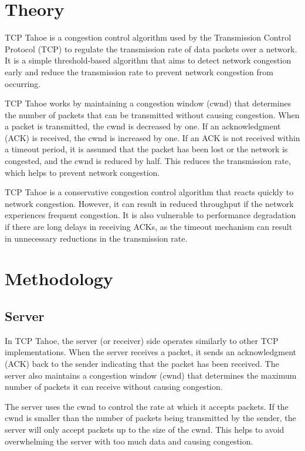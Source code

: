 \documentclass[11pt]{article}
\begin{document}
\section{Theory}
TCP Tahoe is a congestion control algorithm used by the Transmission Control Protocol (TCP) to regulate the transmission rate of data packets over a network. It is a simple threshold-based algorithm that aims to detect network congestion early and reduce the transmission rate to prevent network congestion from occurring.

TCP Tahoe works by maintaining a congestion window (cwnd) that determines the number of packets that can be transmitted without causing congestion. When a packet is transmitted, the cwnd is decreased by one. If an acknowledgment (ACK) is received, the cwnd is increased by one. If an ACK is not received within a timeout period, it is assumed that the packet has been lost or the network is congested, and the cwnd is reduced by half. This reduces the transmission rate, which helps to prevent network congestion.

TCP Tahoe is a conservative congestion control algorithm that reacts quickly to network congestion. However, it can result in reduced throughput if the network experiences frequent congestion. It is also vulnerable to performance degradation if there are long delays in receiving ACKs, as the timeout mechanism can result in unnecessary reductions in the transmission rate.

\section{Methodology}

\subsection{Server}
In TCP Tahoe, the server (or receiver) side operates similarly to other TCP implementations. When the server receives a packet, it sends an acknowledgment (ACK) back to the sender indicating that the packet has been received. The server also maintains a congestion window (cwnd) that determines the maximum number of packets it can receive without causing congestion.

The server uses the cwnd to control the rate at which it accepts packets. If the cwnd is smaller than the number of packets being transmitted by the sender, the server will only accept packets up to the size of the cwnd. This helps to avoid overwhelming the server with too much data and causing congestion.
\end{document}
